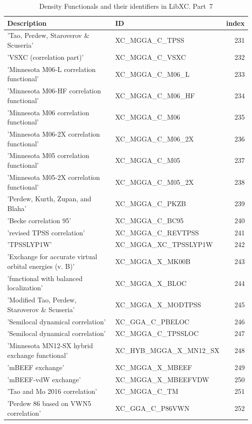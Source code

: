 \documentclass[final,12pt]{article}
\begin{document}
{{{{{{\begin{table}[!h]
\caption{Density Functionals and their identifiers in LibXC. Part~7}
\begin{center}
\begin{tabular}{llr}
\hline
\hline
Description & ID & index\\
\hline
  'Tao, Perdew, Staroverov \& Scuseria' & XC\_MGGA\_C\_TPSS  &231\\
  'VSXC (correlation part)' & XC\_MGGA\_C\_VSXC  &232\\
  'Minnesota M06-L correlation functional' & XC\_MGGA\_C\_M06\_L  &233\\
  'Minnesota M06-HF correlation functional' & XC\_MGGA\_C\_M06\_HF  &234\\
  'Minnesota M06 correlation functional' & XC\_MGGA\_C\_M06  &235\\
  'Minnesota M06-2X correlation functional' & XC\_MGGA\_C\_M06\_2X  &236\\
  'Minnesota M05 correlation functional' & XC\_MGGA\_C\_M05  &237\\
  'Minnesota M05-2X correlation functional' & XC\_MGGA\_C\_M05\_2X  &238\\
  'Perdew, Kurth, Zupan, and Blaha' & XC\_MGGA\_C\_PKZB  &239\\
  'Becke correlation 95' & XC\_MGGA\_C\_BC95  &240\\
  'revised TPSS correlation' & XC\_MGGA\_C\_REVTPSS  &241\\
  'TPSSLYP1W' & XC\_MGGA\_XC\_TPSSLYP1W  &242\\
  'Exchange for accurate virtual orbital energies (v. B)' & XC\_MGGA\_X\_MK00B  &243\\
  'functional with balanced localization' & XC\_MGGA\_X\_BLOC  &244\\
  'Modified Tao, Perdew, Staroverov \& Scuseria' & XC\_MGGA\_X\_MODTPSS  &245\\
  'Semilocal dynamical correlation' & XC\_GGA\_C\_PBELOC  &246\\
  'Semilocal dynamical correlation' & XC\_MGGA\_C\_TPSSLOC  &247\\
  'Minnesota MN12-SX hybrid exchange functional' & XC\_HYB\_MGGA\_X\_MN12\_SX  &248\\
  'mBEEF exchange' & XC\_MGGA\_X\_MBEEF  &249\\
  'mBEEF-vdW exchange' & XC\_MGGA\_X\_MBEEFVDW  &250\\
  'Tao and Mo 2016 correlation' & XC\_MGGA\_C\_TM  &251\\
  'Perdew 86 based on VWN5 correlation' & XC\_GGA\_C\_P86VWN  &252\\

\end{tabular}
\end{center}
\end{table}}}}}}}
\end{document}
